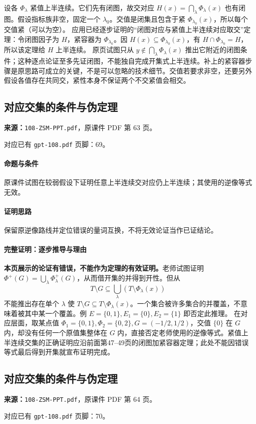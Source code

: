 设各 $\Phi_\lambda$ 紧值上半连续。它们先有闭图，故交对应 $H(x)=\bigcap_\lambda\Phi_\lambda(x)$ 也有闭图。假设指标族非空，固定一个 $\lambda_0$。交值是闭集且包含于紧 $\Phi_{\lambda_0}(x)$，所以每个交值紧（可以为空）。
应用已经逐步证明的“闭图对应与紧值上半连续对应取交”定理：令闭图因子为 $H$，紧容器为 $\Phi_{\lambda_0}$。因 $H(x)\subseteq\Phi_{\lambda_0}(x)$，有 $H\cap\Phi_{\lambda_0}=H$，所以该定理给 $H$ 上半连续。
原页试图只从 $y\notin\bigcap_\lambda\Phi_\lambda(x)$ 推出它附近的闭图条件；这种逐点论证至多先证闭图，不能独自完成开集式上半连续。补上的紧容器步骤是原思路可成立的关键，不是可以忽略的技术细节。交值若要求非空，还要另外假设各值存在共同交，紧性本身不保证两个不交紧值会相交。

\clearpage\subsection{对应交集的条件与伪定理}
\textbf{来源：}\texttt{108-ZSM-PPT.pdf}，原课件 PDF 第 63 页。\par
对应已有 \texttt{gpt-108.pdf} 页脚：69。\par
\paragraph{命题与条件}原课件试图在较弱假设下证明任意上半连续交对应仍上半连续；其使用的逆像等式无效。
\paragraph{证明思路}保留原逆像路线并定位错误的量词互换，不将无效论证当作已证结论。
\paragraph{完整证明：逐步推导与理由}
\textbf{本页展示的论证有错误，不能作为定理的有效证明。}老师试图证明 $\Phi^+(G)=\bigcup_\lambda\Phi_\lambda^+(G)$，从而借开集的并得到开性。但从
\[T\setminus G\subseteq\bigcup_\lambda(T\setminus\Phi_\lambda(x))\]
不能推出存在单个 $\lambda$ 使 $T\setminus G\subseteq T\setminus\Phi_\lambda(x)$。一个集合被许多集合的并覆盖，不意味着被其中某一个覆盖。例 $E=\{0,1\},E_1=\{0\},E_2=\{1\}$ 即否定此推理。
在对应层面，取某点值 $\Phi_1=\{0,1\},\Phi_2=\{0,2\},G=(-1/2,1/2)$，交值 $\{0\}$ 在 $G$ 内，却没有任何一个原值集整体在 $G$ 内，直接否定老师使用的逆像等式。紧值上半连续交集的正确证明应沿前面第47--49页的闭图加紧容器定理；此处不能因错误等式最后得到开集就宣布证明完成。
\clearpage\subsection{对应交集的条件与伪定理}
\textbf{来源：}\texttt{108-ZSM-PPT.pdf}，原课件 PDF 第 64 页。\par
对应已有 \texttt{gpt-108.pdf} 页脚：70。\par
